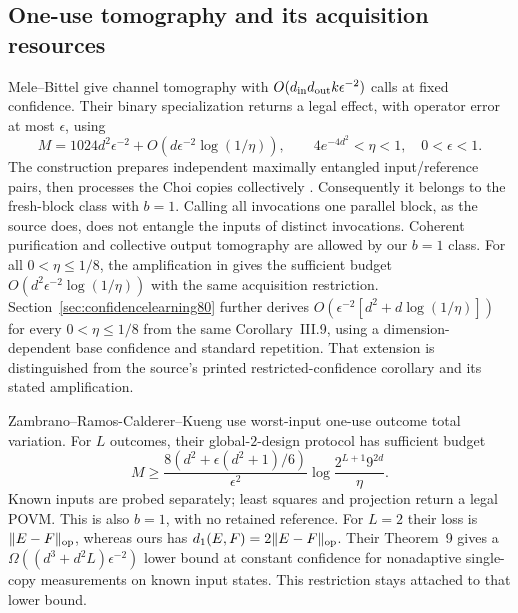 \subsection{One-use tomography and its acquisition resources}
Mele--Bittel \cite[Theorem~I.1]{MB67} give channel tomography
with $O(d_{\rm in}d_{\rm out}k\epsilon^{-2})$ calls at fixed
confidence. Their binary specialization
\cite[Lemmas~III.7--III.8 and Corollary~III.9]{MB67} returns a
legal effect, with operator error at most $\epsilon$, using
\[
 M=1024d^2\epsilon^{-2}
   +O(d\epsilon^{-2}\log(1/\eta)),
 \qquad 4e^{-4d^2}<\eta<1,\quad 0<\epsilon<1.
\]
The construction prepares independent maximally entangled
input/reference pairs, then processes the Choi copies collectively
\cite[Algorithm~I.2, Figure~1 and Section~III.2]{MB67}.
Consequently it belongs to the fresh-block class with $b=1$.
Calling all invocations one parallel block, as the source does,
does not entangle the inputs of distinct invocations. Coherent
purification and collective output tomography are allowed by our
$b=1$ class. For all $0<\eta\le1/8$, the amplification in
\cite[Remark~III.4, equation~(165)]{MB67} gives the sufficient
budget $O(d^2\epsilon^{-2}\log(1/\eta))$ with the same acquisition
restriction. Section~\ref{sec:confidencelearning80} further derives
$O(\epsilon^{-2}[d^2+d\log(1/\eta)])$ for every
$0<\eta\le1/8$ from the same Corollary~III.9, using a
dimension-dependent base confidence and standard repetition.
That extension is distinguished from the source's printed
restricted-confidence corollary and its stated amplification.

Zambrano--Ramos-Calderer--Kueng \cite[Definition~1 and Theorem~2]{ZRK76}
use worst-input one-use outcome total variation. For $L$ outcomes,
their global-$2$-design protocol has sufficient budget
\[
 M\ge \frac{8(d^2+\epsilon(d^2+1)/6)}{\epsilon^2}
       \log\frac{2^{L+1}9^{2d}}{\eta}.
\]
Known inputs are probed separately; least squares and projection
return a legal POVM. This is also $b=1$, with no retained reference.
For $L=2$ their loss is $\|E-F\|_{\rm op}$, whereas ours has
$d_1(E,F)=2\|E-F\|_{\rm op}$. Their Theorem~9 gives a
$\Omega((d^3+d^2L)\epsilon^{-2})$ lower bound at constant confidence
for nonadaptive single-copy measurements on known input states.
This restriction stays attached to that lower bound.

